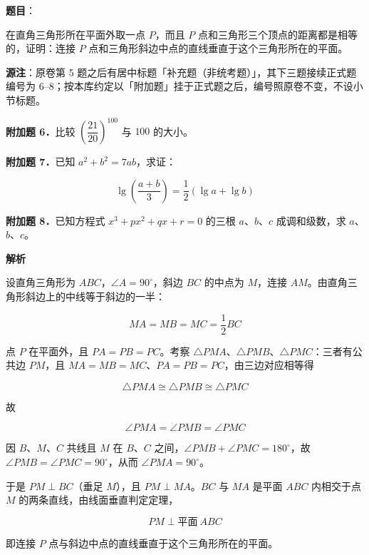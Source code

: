 \begin{answer}

\textbf{题目}：

在直角三角形所在平面外取一点 $P$，而且 $P$ 点和三角形三个顶点的距离都是相等的，证明：连接 $P$ 点和三角形斜边中点的直线垂直于这个三角形所在的平面。

\begin{gktip}
\textbf{源注}：原卷第 5 题之后有居中标题「补充题（非统考题）」，其下三题接续正式题编号为 $6$–$8$；按本库约定以「附加题」挂于正式题之后，编号照原卷不变，不设小节标题。
\end{gktip}

\textbf{附加题 6．}比较 $\left(\dfrac{21}{20}\right)^{100}$ 与 $100$ 的大小。

\textbf{附加题 7．}已知 $a^2+b^2=7ab$，求证：

\nopagebreak[4]
\[
\lg\left(\frac{a+b}{3}\right)=\frac12(\lg a+\lg b)
\]

\textbf{附加题 8．}已知方程式 $x^3+px^2+qx+r=0$ 的三根 $a$、$b$、$c$ 成调和级数，求 $a$、$b$、$c$。

\textbf{解析}

设直角三角形为 $ABC$，$\angle A=90^\circ$，斜边 $BC$ 的中点为 $M$，连接 $AM$。由直角三角形斜边上的中线等于斜边的一半：

\nopagebreak[4]
\[
MA=MB=MC=\frac12BC
\]

点 $P$ 在平面外，且 $PA=PB=PC$。考察 $\triangle PMA$、$\triangle PMB$、$\triangle PMC$：三者有公共边 $PM$，且 $MA=MB=MC$、$PA=PB=PC$，由三边对应相等得

\nopagebreak[4]
\[
\triangle PMA\cong\triangle PMB\cong\triangle PMC
\]

故

\nopagebreak[4]
\[
\angle PMA=\angle PMB=\angle PMC
\]

因 $B$、$M$、$C$ 共线且 $M$ 在 $B$、$C$ 之间，$\angle PMB+\angle PMC=180^\circ$，故 $\angle PMB=\angle PMC=90^\circ$，从而 $\angle PMA=90^\circ$。

于是 $PM\perp BC$（垂足 $M$），且 $PM\perp MA$。$BC$ 与 $MA$ 是平面 $ABC$ 内相交于点 $M$ 的两条直线，由线面垂直判定定理，

\nopagebreak[4]
\[
PM\perp \text{平面}\ ABC
\]

即连接 $P$ 点与斜边中点的直线垂直于这个三角形所在的平面。



\end{answer}
